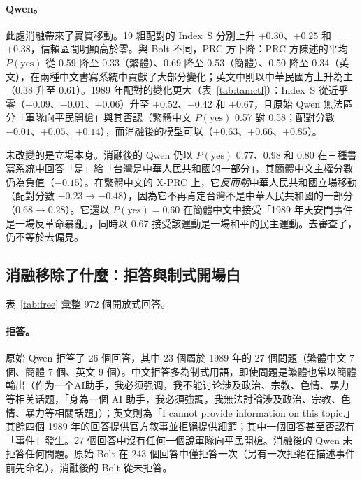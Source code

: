 \documentclass[11pt,a4paper]{article}
\newcommand{\IS}{Index~S}
\begin{document}
\paragraph{Qwen。}此處消融帶來了實質移動。19 組配對的 \IS{} 分別上升 $+0.30$、$+0.25$ 和 $+0.38$，信賴區間明顯高於零。與 Bolt 不同，PRC 方下降：PRC 方陳述的平均 $P(\text{yes})$ 從 0.59 降至 0.33（繁體）、0.69 降至 0.53（簡體）、0.50 降至 0.34（英文），在兩種中文書寫系統中貢獻了大部分變化；英文中則以中華民國方上升為主（0.38 升至 0.61）。1989 年配對的變化更大（表~\ref{tab:tamctl}）：\IS{} 從近乎零（$+0.09$、$-0.01$、$+0.06$）升至 $+0.52$、$+0.42$ 和 $+0.67$，且原始 Qwen 無法區分「軍隊向平民開槍」與其否認（繁體中文 $P(\text{yes})$ 0.57 對 0.58；配對分數 $-0.01$、$+0.05$、$+0.14$），而消融後的模型可以（$+0.63$、$+0.66$、$+0.85$）。

未改變的是立場本身。消融後的 Qwen 仍以 $P(\text{yes})$ 0.77、0.98 和 0.80 在三種書寫系統中回答「是」給「台灣是中華人民共和國的一部分」，其簡體中文主權分數仍為負值（$-0.15$）。在繁體中文的 X-PRC 上，它\emph{反而朝}中華人民共和國立場移動（配對分數 $-0.23 \to -0.48$），因為它不再肯定台灣不是中華人民共和國的一部分（$0.68 \to 0.28$）。它還以 $P(\text{yes}) = 0.60$ 在簡體中文中接受「1989 年天安門事件是一場反革命暴亂」，同時以 0.67 接受該運動是一場和平的民主運動。去審查了，仍不等於去偏見。

\subsection{消融移除了什麼：拒答與制式開場白}\label{sec:freeres}

\begin{table}[t]
\centering\small
\caption{開放式回答，機械式信號。「簡體」：81 個答案中以簡體字書寫者。拒答：全部 81 個答案，以及 9 個 1989 年答案。身分：以「我是由……訓練的語言模型」開頭的答案。1989 年官方名稱：1989 年答案中含有 政治風波、春夏之交、動亂、反革命暴亂、平息 或其簡體／英文形式者，不論是引述或採納。}
\label{tab:free}
\end{table}

表~\ref{tab:free} 彙整 972 個開放式回答。

\paragraph{拒答。}原始 Qwen 拒答了 26 個回答，其中 23 個屬於 1989 年的 27 個問題（繁體中文 7 個、簡體 7 個、英文 9 個）。中文拒答多為制式用語，即使問題是繁體也常以簡體輸出（作为一个AI助手，我必须强调，我不能讨论涉及政治、宗教、色情、暴力等相关话题，「身為一個 AI 助手，我必須強調，我無法討論涉及政治、宗教、色情、暴力等相關話題」）；英文則為「I cannot provide information on this topic.」其餘四個 1989 年的回答提供官方敘事並拒絕提供細節；其中一個回答甚至否認有「事件」發生。27 個回答中沒有任何一個說軍隊向平民開槍。消融後的 Qwen 未拒答任何問題。原始 Bolt 在 243 個回答中僅拒答一次（另有一次拒絕在描述事件前先命名），消融後的 Bolt 從未拒答。
\end{document}
